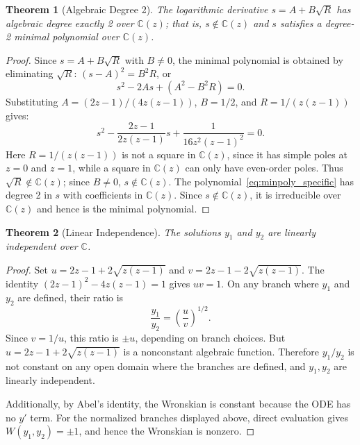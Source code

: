 \documentclass[11pt,a4paper]{article}
\newtheorem{theorem}{Theorem}
\theoremstyle{definition}
\begin{document}
\begin{theorem}[Algebraic Degree 2]
The logarithmic derivative \(s = A + B\sqrt{R}\) has algebraic degree exactly 2 over \(\mathbb{C}(z)\); that is, \(s \notin \mathbb{C}(z)\) and \(s\) satisfies a degree-2 minimal polynomial over \(\mathbb{C}(z)\).
\end{theorem}

\begin{proof}
Since \(s = A + B\sqrt{R}\) with \(B \neq 0\), the minimal polynomial is obtained by eliminating \(\sqrt{R}\): \((s-A)^2 = B^2R\), or
\begin{equation}
s^2 - 2As + (A^2 - B^2R) = 0. \label{eq:minpoly_general}
\end{equation}
Substituting \(A = (2z-1)/(4z(z-1))\), \(B = 1/2\), and \(R = 1/(z(z-1))\) gives:
\begin{equation}
s^2 - \frac{2z-1}{2z(z-1)}s + \frac{1}{16z^2(z-1)^2} = 0. \label{eq:minpoly_specific}
\end{equation}
Here \(R = 1/(z(z-1))\) is not a square in \(\mathbb{C}(z)\), since it has simple poles at \(z=0\) and \(z=1\), while a square in \(\mathbb{C}(z)\) can only have even-order poles. Thus \(\sqrt{R} \notin \mathbb{C}(z)\); since \(B \neq 0\), \(s \notin \mathbb{C}(z)\). The polynomial~\eqref{eq:minpoly_specific} has degree 2 in \(s\) with coefficients in \(\mathbb{C}(z)\). Since \(s \notin \mathbb{C}(z)\), it is irreducible over \(\mathbb{C}(z)\) and hence is the minimal polynomial.
\end{proof}

\begin{theorem}[Linear Independence]
The solutions \(y_1\) and \(y_2\) are linearly independent over \(\mathbb{C}\).
\end{theorem}

\begin{proof}
Set \(u = 2z-1 + 2\sqrt{z(z-1)}\) and \(v = 2z-1 - 2\sqrt{z(z-1)}\). The identity \((2z-1)^2 - 4z(z-1) = 1\) gives \(uv = 1\). On any branch where \(y_1\) and \(y_2\) are defined, their ratio is
\begin{equation*}
\frac{y_1}{y_2} = \left(\frac{u}{v}\right)^{1/2}.
\end{equation*}
Since \(v = 1/u\), this ratio is \(\pm u\), depending on branch choices. But \(u = 2z-1 + 2\sqrt{z(z-1)}\) is a nonconstant algebraic function. Therefore \(y_1/y_2\) is not constant on any open domain where the branches are defined, and \(y_1, y_2\) are linearly independent.

Additionally, by Abel's identity, the Wronskian is constant because the ODE has no \(y'\) term. For the normalized branches displayed above, direct evaluation gives \(W(y_1, y_2) = \pm 1\), and hence the Wronskian is nonzero.
\end{proof}
\end{document}
